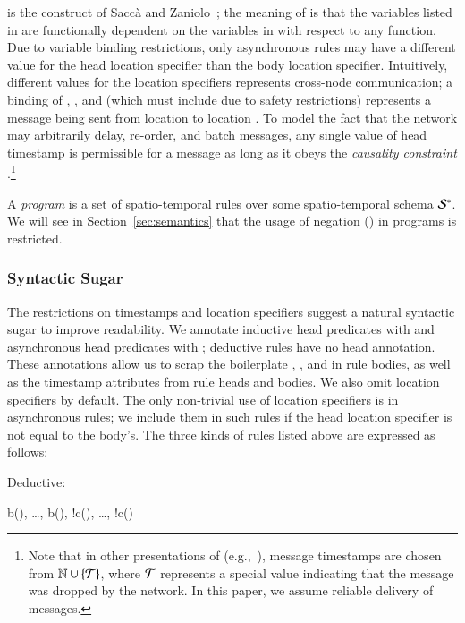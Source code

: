  is the construct of Sacc\`{a} and Zaniolo~\cite{sacca-zaniolo};
the meaning of  is that the variables listed
in  are functionally dependent on the variables in  with respect to
any function.  Due to variable binding restrictions, only asynchronous rules may
have a different value for the head location specifier than the body location
specifier.  Intuitively, different values for the location specifiers represents
cross-node communication; a binding of , , and 
(which must include  due to safety restrictions) represents a message
being sent from location  to location .  To model the fact
that the network may arbitrarily delay, re-order, and batch messages, any single
value of head timestamp  is permissible for a message as long as it
obeys the {\em causality constraint} .\footnote{Note that in
  other presentations of \lang (e.g.,~\cite{dedalus}), message timestamps are
  chosen from $\mathbb{N} \cup \{\Tau\}$, where $\Tau$ represents a special value
  indicating that the message was dropped by the network. In this paper, we
  assume reliable delivery of messages.}

A \lang \emph{program} is a set of spatio-temporal rules over some
spatio-temporal schema $\stschema$.  We will see in Section~\ref{sec:semantics} that the usage of negation (\dedalus{!}) in \lang programs is restricted.

\subsubsection{Syntactic Sugar}
The restrictions on timestamps and location specifiers suggest a natural
syntactic sugar to improve readability.  We annotate inductive head predicates
with  and asynchronous head predicates with ;
deductive rules have no head annotation.  These annotations allow us to scrap
the boilerplate , ,  and
 in rule bodies, as well as the timestamp attributes from rule
heads and bodies.  We also omit location specifiers by default. The only non-trivial use of location specifiers is in asynchronous rules; we include them in such rules if the head location specifier is not equal to the
body's.  The three kinds of rules listed above are expressed as follows:

Deductive:

\begin{Drules}
        {b(), \ldots, b(), !c(), \ldots, !c()}
\end{Drules}

